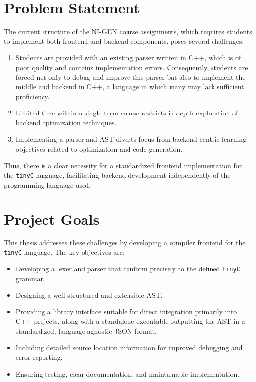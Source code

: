 \section{Problem Statement}

The current structure of the NI-GEN course assignments, which requires students to implement both frontend and backend components, poses several challenges:

\begin{enumerate}
    \item Students are provided with an existing parser written in C++, which is of poor quality and contains implementation errors. Consequently, students are forced not only to debug and improve this parser but also to implement the middle and backend in C++, a language in which many may lack sufficient proficiency.
    \item Limited time within a single-term course restricts in-depth exploration of backend optimization techniques.
    \item Implementing a parser and AST diverts focus from backend-centric learning objectives related to optimization and code generation.
\end{enumerate}

Thus, there is a clear necessity for a standardized frontend implementation for the \texttt{tinyC} language, facilitating backend development independently of the programming language used.

\section{Project Goals}

This thesis addresses these challenges by developing a compiler frontend for the \texttt{tinyC} language. The key objectives are:

\begin{itemize}
\item Developing a lexer and parser that conform precisely to the defined \texttt{tinyC} grammar.
\item Designing a well-structured and extensible AST.
\item Providing a library interface suitable for direct integration primarily into C++ projects, along with a standalone executable outputting the AST in a standardized, language-agnostic JSON format.
\item Including detailed source location information for improved debugging and error reporting.
\item Ensuring testing, clear documentation, and maintainable implementation.
\end{itemize}

